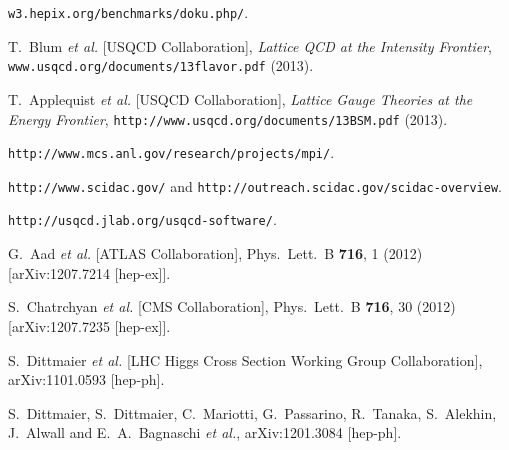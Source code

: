 
\begin{thebibliography}{99}

  
{\tt w3.hepix.org/benchmarks/doku.php/}.

T.~Blum {\em et al.} [USQCD Collaboration],
{\em Lattice QCD at the Intensity Frontier},
{\tt www.usqcd.org/documents/13flavor.pdf} (2013).

T.~Applequist {\em et al.} [USQCD Collaboration],
{\em Lattice Gauge Theories at the Energy Frontier},
{\tt http://www.usqcd.org/documents/13BSM.pdf} (2013).

{\tt http://www.mcs.anl.gov/research/projects/mpi/}.

{\tt http://www.scidac.gov/} and {\tt http://outreach.scidac.gov/scidac-overview}.
  
{\tt http://usqcd.jlab.org/usqcd-software/}.


  G.~Aad {\it et al.}  [ATLAS Collaboration],
  Phys.\ Lett.\ B {\bf 716}, 1 (2012)
  [arXiv:1207.7214 [hep-ex]].

  S.~Chatrchyan {\it et al.}  [CMS Collaboration],
  Phys.\ Lett.\ B {\bf 716}, 30 (2012)
  [arXiv:1207.7235 [hep-ex]].

  S.~Dittmaier {\it et al.}  [LHC Higgs Cross Section Working Group Collaboration],
  arXiv:1101.0593 [hep-ph].

  S.~Dittmaier, S.~Dittmaier, C.~Mariotti, G.~Passarino, R.~Tanaka, S.~Alekhin, J.~Alwall and E.~A.~Bagnaschi {\it et al.},
  arXiv:1201.3084 [hep-ph].


\end{thebibliography}
